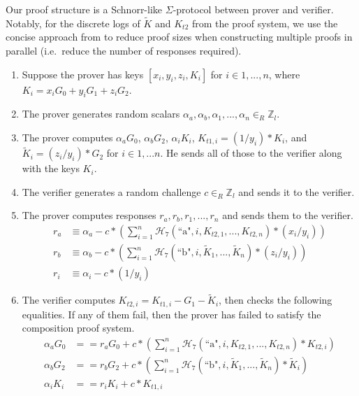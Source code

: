 \begin{appendices}
[[[better terminology than `proof structure'?]

Our proof structure is a Schnorr-like $\Sigma$-protocol between prover and verifier. Notably, for the discrete logs of $\tilde{K}$ and $K_{t2}$ from the proof system, we use the concise approach from \cite{clsag-eprint} to reduce proof sizes when constructing multiple proofs in parallel (i.e.\ reduce the number of responses required).

\begin{enumerate}
    \item Suppose the prover has keys $[x_i, y_i, z_i, K_i]$ for $i \in 1,...,n$, where $K_i = x_i G_0 + y_i G_1 + z_i G_2$.

    \item The prover generates random scalars $\alpha_a, \alpha_b, \alpha_1, ..., \alpha_n \in_R \mathbb{Z}_l$.

    \item The prover computes $\alpha_a G_0$, $\alpha_b G_2$, $\alpha_i K_i$, $K_{t1,i} = (1/y_i)*K_i$, and $\tilde{K}_i = (z_i/y_i)*G_2$ for $i \in 1,...n$. He sends all of those to the verifier along with the keys $K_i$.

    \item The verifier generates a random challenge $c \in_R \mathbb{Z}_l$ and sends it to the verifier.

    \item The prover computes responses $r_a, r_b, r_1, ..., r_n$ and sends them to the verifier.\vspace{.115cm}
    \begin{align*}
        r_a &\equiv \alpha_a - c*(\sum^n_{i=1} \mathcal{H}_7(\textrm{``a"}, i, K_{t2,1},...,K_{t2,n})*(x_i/y_i)) \\
        r_b &\equiv \alpha_b - c*(\sum^n_{i=1} \mathcal{H}_7(\textrm{``b"}, i, \tilde{K}_1,...,\tilde{K}_n)*(z_i/y_i)) \\
        r_i &\equiv \alpha_i - c*(1/y_i)
    \end{align*}

    \item The verifier computes $K_{t2,i} = K_{t1,i} - G_1 - \tilde{K}_i$, then checks the following equalities. If any of them fail, then the prover has failed to satisfy the composition proof system.\vspace{.115cm}
    \begin{align*}
        \alpha_a G_0 &== r_a G_0 + c*(\sum^n_{i=1} \mathcal{H}_7(\textrm{``a"}, i, K_{t2,1},...,K_{t2,n})*K_{t2,i}) \\
        \alpha_b G_2 &== r_b G_2 + c*(\sum^n_{i=1} \mathcal{H}_7(\textrm{``b"}, i, \tilde{K}_1,...,\tilde{K}_n)*\tilde{K}_i) \\
        \alpha_i K_i &== r_i K_i + c*K_{t1,i}
    \end{align*}
\end{enumerate}



\end{appendices}
